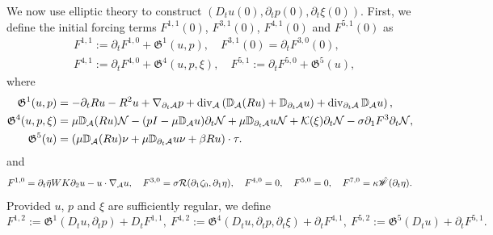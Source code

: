 \documentclass[letterpaper,reqno,10pt,twoside]{amsart}
\theoremstyle{definition}
\theoremstyle{remark}
\def\p{\partial}
\def\dive{\mathop{\rm div}\nolimits}
\begin{document}
\begin{appendix}
			We now use elliptic theory to construct $(D_tu(0), \p_tp(0), \p_t\xi(0))$. First, we define the initial forcing terms $F^{1,1}(0)$, $F^{3,1}(0)$, $F^{4,1}(0)$ and $F^{5,1}(0)$ as
			\begin{equation}\label{def:F_11}
				\begin{aligned}
					&F^{1,1}:=\p_tF^{1,0}+\mathfrak{G}^1(u,p), \quad F^{3,1}(0)=\p_tF^{3,0}(0),\\
					&F^{4,1}:=\p_tF^{4,0}+\mathfrak{G}^4(u,p,\xi),\quad F^{5,1}:=\p_tF^{5,0}+\mathfrak{G}^5(u),
				\end{aligned}
			\end{equation}
			where
			\begin{equation}\label{def:map_g}
				\begin{aligned}
					\mathfrak{G}^1(u,p)&=-\p_tRu -R^2u+\nabla_{\p_t\mathcal{A}}p+\dive_{\mathcal{A}}\left(\mathbb{D}_{\mathcal{A}}(Ru)+\mathbb{D}_{\p_t\mathcal{A}}u)+ \dive_{\p_t\mathcal{A}}\mathbb{D}_{\mathcal{A}}u\right),\\
					\mathfrak{G}^4(u,p,\xi)&=\mu\mathbb{D}_{\mathcal{A}}(Ru)\mathcal{N}-(pI-\mu\mathbb{D}_{\mathcal{A}}u)\p_t\mathcal{N}+\mu\mathbb{D}_{\p_t\mathcal{A}}u\mathcal{N}+\mathcal{K}(\xi)\p_t\mathcal{N}-\sigma\p_1F^3\p_t\mathcal{N},\\
					\mathfrak{G}^5(u)&=(\mu\mathbb{D}_{\mathcal{A}}(Ru)\nu+\mu\mathbb{D}_{\p_t\mathcal{A}}u\nu+\beta Ru)\cdot\tau.
				\end{aligned}
			\end{equation}
			\noindent and
			\begin{equation}{\label{def:forcing_0}}
				F^{1,0}=\p_t\bar{\eta}WK\p_2u-u\cdot\nabla_{\mathcal{A}}u,\quad F^{3,0}=\sigma\mathcal{R}(\p_1\zeta_0,\p_1\eta),\quad F^{4,0}=0,\quad F^{5,0}=0,\quad F^{7,0}=\kappa\hat{\mathscr{W}}(\p_t\eta).
			\end{equation}
			Provided $u$, $p$ and $\xi$ are sufficiently regular, we define
			\begin{equation}\label{def:forcej2}
				F^{1,2}:=\mathfrak{G}^1(D_tu,\p_tp)+D_tF^{1,1},\
				F^{4,2}:=\mathfrak{G}^4(D_tu,\p_tp,\p_t\xi)+\p_tF^{4,1},\
				F^{5,2}:=\mathfrak{G}^5(D_tu)+\p_tF^{5,1}.
			\end{equation}
			

\end{appendix}
\end{document}
